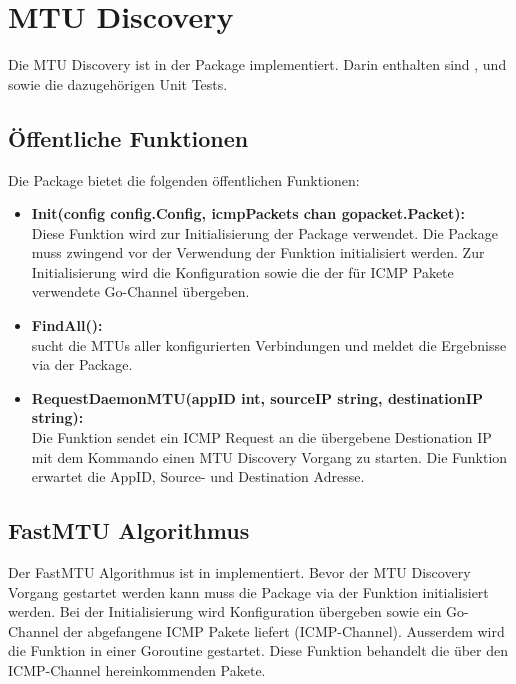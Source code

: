 \section{MTU Discovery}
\label{sec:MTU Discovery}

Die \ac{MTU} Discovery ist in der  Package implementiert. Darin enthalten sind ,  und  sowie die dazugehörigen Unit Tests.

\subsection{Öffentliche Funktionen}
Die  Package bietet die folgenden öffentlichen Funktionen:

\begin{itemize}
\item \textbf{Init(config config.Config, icmpPackets chan gopacket.Packet):} \\
Diese Funktion wird zur Initialisierung der  Package verwendet. Die Package muss zwingend vor der Verwendung der  Funktion initialisiert werden. Zur Initialisierung wird die Konfiguration sowie die der für \ac{ICMP} Pakete verwendete Go-Channel übergeben.
\item \textbf{FindAll():} \\
 sucht die \ac{MTU}s aller konfigurierten Verbindungen und meldet die Ergebnisse via der  Package.
\item \textbf{RequestDaemonMTU(appID int, sourceIP string, destinationIP string):} \\
Die Funktion  sendet ein ICMP Request an die übergebene Destionation IP mit dem Kommando einen \ac{MTU} Discovery Vorgang zu starten. Die Funktion erwartet die AppID, Source- und Destination Adresse.
\end{itemize}

\subsection{FastMTU Algorithmus}
Der FastMTU Algorithmus ist in  implementiert. Bevor der \ac{MTU} Discovery Vorgang gestartet werden kann muss die  Package via der  Funktion initialisiert werden. Bei der Initialisierung wird Konfiguration übergeben sowie ein Go-Channel der abgefangene \ac{ICMP} Pakete liefert (ICMP-Channel). Ausserdem wird die Funktion  in einer Goroutine gestartet. Diese Funktion behandelt die über den ICMP-Channel hereinkommenden Pakete.


